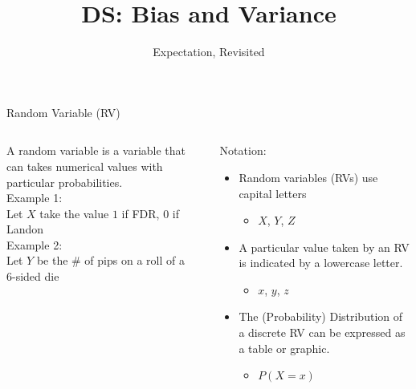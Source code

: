 \documentclass[aspectratio=169]{../latex_main/tntbeamer}  %
\title[Statistics]{DS: Bias and Variance}
\subtitle{Expectation, Revisited}
\begin{document}
	
	\maketitle
	\begin{frame}{Random Variable (RV)}
	    \begin{columns}
	        \begin{column}{.4\textwidth}
	                A random variable is a variable that can takes numerical values with particular probabilities.\\
	                \bigskip
	                Example 1:\\
                    Let $X$ take the value $1$ if FDR, $0$ if \\
                    Landon\\
                    \bigskip
                    Example 2:\\
                    Let $Y$ be the \# of pips on a roll of a \\
                    6-sided die



	        \end{column}
	        
	        
	        \begin{column}{.4\textwidth}
	            Notation:
	                \begin{itemize}
	                    \item Random variables (RVs) use capital letters
	                    \begin{itemize}
	                        \item $X$, $Y$, $Z$
	                    \end{itemize}
	                    \item A particular value taken by an RV is indicated by a lowercase letter.
	                    \begin{itemize}
	                        \item $x$, $y$, $z$
	                    \end{itemize}
	                    \item The (Probability) Distribution of a discrete RV can be expressed as a table or graphic.
	                    \begin{itemize}
	                        \item $P(X = x)$
	                    \end{itemize}
	                \end{itemize}
	        \end{column}
	    \end{columns}
	\end{frame}
	
\end{document}
